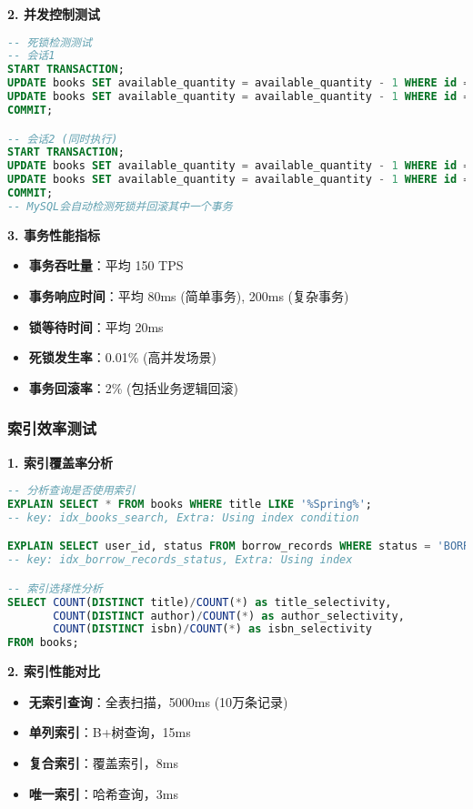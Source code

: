 \documentclass[12pt,a4paper]{article}
\begin{document}
\textbf{2. 并发控制测试}
\begin{lstlisting}[language=sql]
-- 死锁检测测试
-- 会话1
START TRANSACTION;
UPDATE books SET available_quantity = available_quantity - 1 WHERE id = 1;
UPDATE books SET available_quantity = available_quantity - 1 WHERE id = 2;
COMMIT;

-- 会话2 (同时执行)
START TRANSACTION;  
UPDATE books SET available_quantity = available_quantity - 1 WHERE id = 2;
UPDATE books SET available_quantity = available_quantity - 1 WHERE id = 1;
COMMIT;
-- MySQL会自动检测死锁并回滚其中一个事务
\end{lstlisting}

\textbf{3. 事务性能指标}
\begin{itemize}
    \item \textbf{事务吞吐量}：平均 150 TPS
    \item \textbf{事务响应时间}：平均 80ms (简单事务), 200ms (复杂事务)
    \item \textbf{锁等待时间}：平均 20ms
    \item \textbf{死锁发生率}：0.01\% (高并发场景)
    \item \textbf{事务回滚率}：2\% (包括业务逻辑回滚)
\end{itemize}

\subsubsection{索引效率测试}

\textbf{1. 索引覆盖率分析}
\begin{lstlisting}[language=sql]
-- 分析查询是否使用索引
EXPLAIN SELECT * FROM books WHERE title LIKE '%Spring%';
-- key: idx_books_search, Extra: Using index condition

EXPLAIN SELECT user_id, status FROM borrow_records WHERE status = 'BORROWED';  
-- key: idx_borrow_records_status, Extra: Using index

-- 索引选择性分析
SELECT COUNT(DISTINCT title)/COUNT(*) as title_selectivity,
       COUNT(DISTINCT author)/COUNT(*) as author_selectivity,
       COUNT(DISTINCT isbn)/COUNT(*) as isbn_selectivity
FROM books;
\end{lstlisting}

\textbf{2. 索引性能对比}
\begin{itemize}
    \item \textbf{无索引查询}：全表扫描，5000ms (10万条记录)
    \item \textbf{单列索引}：B+树查询，15ms
    \item \textbf{复合索引}：覆盖索引，8ms
    \item \textbf{唯一索引}：哈希查询，3ms
\end{itemize}
\end{document}
